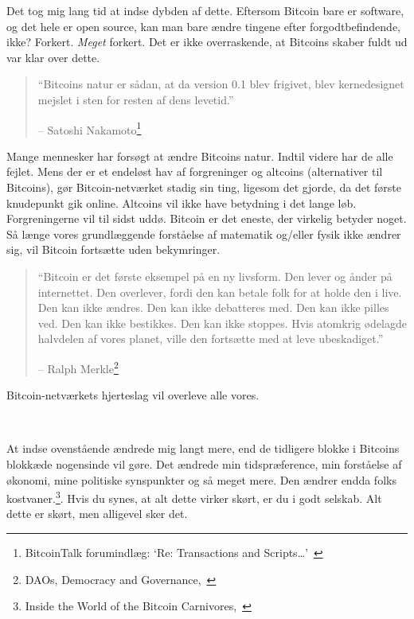 \documentclass[paper=6in:9in,pagesize=pdftex,
               headinclude=on,footinclude=on,12pt]{scrbook}
\begin{document}
Det tog mig lang tid at indse dybden af dette. Eftersom Bitcoin bare er software, og det hele er open source, kan man bare ændre tingene efter forgodtbefindende, ikke? Forkert. \textit{Meget} forkert. Det er ikke overraskende, at Bitcoins skaber fuldt ud var klar over dette.\begin{quotation}\begin{samepage} \enquote{Bitcoins natur er sådan, at da version 0.1 blev frigivet, blev kernedesignet mejslet i sten for resten af dens levetid.} \begin{flushright} -- Satoshi Nakamoto\footnote{BitcoinTalk forumindlæg: `Re: Transactions and Scripts\ldots'~\cite{satoshi-set-in-stone}}
\end{flushright}\end{samepage}\end{quotation}

Mange mennesker har forsøgt at ændre Bitcoins natur. Indtil videre har de alle fejlet. Mens der er et endeløst hav af forgreninger og altcoins (alternativer til Bitcoins), gør Bitcoin-netværket stadig sin ting, ligesom det gjorde, da det første knudepunkt gik online. Altcoins vil ikke have betydning i det lange løb. Forgreningerne vil til sidst uddø. Bitcoin er det eneste, der virkelig betyder noget. Så længe vores grundlæggende forståelse af matematik og/eller fysik ikke ændrer sig, vil Bitcoin fortsætte uden bekymringer.\begin{quotation}\begin{samepage}
\enquote{Bitcoin er det første eksempel på en ny livsform. Den lever og ånder på internettet. Den overlever, fordi den kan betale folk for at holde den i live. Den kan ikke ændres. Den kan ikke debatteres med. Den kan ikke pilles ved. Den kan ikke bestikkes. Den kan ikke stoppes. Hvis atomkrig ødelagde halvdelen af vores planet, ville den fortsætte med at leve ubeskadiget.}
\begin{flushright} -- Ralph Merkle\footnote{DAOs, Democracy and Governance,~\cite{merkle-dao}}
\end{flushright}\end{samepage}\end{quotation}

Bitcoin-netværkets hjerteslag vil overleve alle vores.

~

At indse ovenstående ændrede mig langt mere, end de tidligere blokke i Bitcoins blokkæde nogensinde vil gøre. Det ændrede min tidspræference, min forståelse af økonomi, mine politiske synspunkter og så meget mere. Den ændrer endda folks kostvaner.\footnote{Inside the World of the Bitcoin Carnivores,~\cite{carnivores}}. Hvis du synes, at alt dette virker skørt, er du i godt selskab. Alt dette er skørt, men alligevel sker det.
\end{document}
